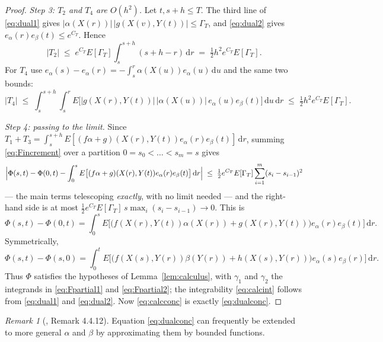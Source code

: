 \documentclass[11pt,a4paper]{article}
\theoremstyle{plain}
\theoremstyle{definition}
\theoremstyle{remark}
\newtheorem{remark}[theorem]{Remark}
\newcommand{\dif}{\,\mathrm{d}}
\newcommand{\EK}{\cite{EK86}}
\begin{document}
\begin{proof}
  \emph{Step 3: $T_2$ and $T_4$ are $O(h^2)$.}  Let $t, s+h \leq T$.  The third
  line of \eqref{eq:dual1} gives
  $|\alpha(X(r))| \, |g(X(v),Y(t))| \leq \Gamma_T$, and \eqref{eq:dual2} gives
  $e_\alpha(r) e_\beta(t) \leq e^{C_T}$.  Hence
  \[
    |T_2| \;\leq\; e^{C_T} E[\Gamma_T] \int_s^{s+h} (s+h-r) \dif r
          \;=\; \tfrac{1}{2} h^2 e^{C_T} E[\Gamma_T] .
  \]
  For $T_4$ use $e_\alpha(s) - e_\alpha(r) = -\int_s^r \alpha(X(u)) e_\alpha(u)\dif u$
  and the same two bounds:
  \[
    |T_4| \;\leq\; \int_s^{s+h} \!\! \int_s^r
      E\bigl[ |g(X(r),Y(t))| \, |\alpha(X(u))| \, e_\alpha(u) e_\beta(t) \bigr] \dif u \dif r
      \;\leq\; \tfrac{1}{2} h^2 e^{C_T} E[\Gamma_T] .
  \]

  \emph{Step 4: passing to the limit.}  Since
  $T_1 + T_3 = \int_s^{s+h} E[(f\alpha + g)(X(r),Y(t)) e_\alpha(r) e_\beta(t)]\dif r$,
  summing \eqref{eq:Fincrement} over a partition
  $0 = s_0 < \dots < s_m = s$ gives
  \[
    \Bigl| \Phi(s,t) - \Phi(0,t)
      - \int_0^s E\bigl[ (f\alpha + g)(X(r),Y(t)) e_\alpha(r) e_\beta(t) \bigr] \dif r \Bigr|
    \;\leq\; \tfrac{1}{2} e^{C_T} E[\Gamma_T] \sum_{i=1}^m (s_i - s_{i-1})^2
  \]
  --- the main terms telescoping \emph{exactly}, with no limit needed --- and the
  right-hand side is at most
  $\tfrac{1}{2} e^{C_T} E[\Gamma_T] \, s \max_i (s_i - s_{i-1}) \to 0$.  This is
  \begin{equation}
    \label{eq:Fpartial1}
    \Phi(s,t) - \Phi(0,t)
      = \int_0^s E\bigl[ \bigl( f(X(r),Y(t)) \alpha(X(r)) + g(X(r),Y(t)) \bigr)
          e_\alpha(r) e_\beta(t) \bigr] \dif r .
  \end{equation}
  Symmetrically,
  \begin{equation}
    \label{eq:Fpartial2}
    \Phi(s,t) - \Phi(s,0)
      = \int_0^t E\bigl[ \bigl( f(X(s),Y(r)) \beta(Y(r)) + h(X(s),Y(r)) \bigr)
          e_\alpha(s) e_\beta(r) \bigr] \dif r .
  \end{equation}
  Thus $\Phi$ satisfies the hypotheses of Lemma~\ref{lem:calculus}, with $\gamma_1$ and
  $\gamma_2$ the integrands in \eqref{eq:Fpartial1} and \eqref{eq:Fpartial2}; the
  integrability \eqref{eq:calcint} follows from \eqref{eq:dual1} and
  \eqref{eq:dual2}.  Now \eqref{eq:calcconc} is exactly \eqref{eq:dualconc}.
\end{proof}

\begin{remark}[\EK, Remark 4.4.12]
  \label{rem:dualext}
  Equation \eqref{eq:dualconc} can frequently be extended to more general
  $\alpha$ and $\beta$ by approximating them by bounded functions.
\end{remark}
\end{document}
